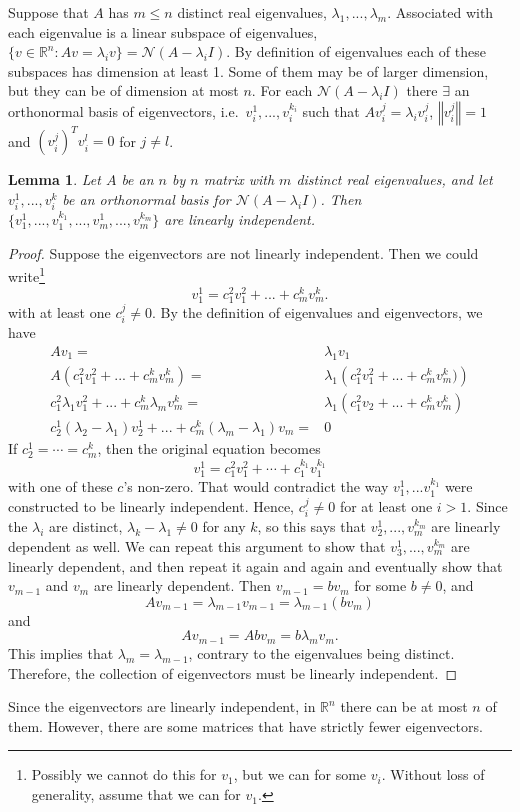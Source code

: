 \documentclass[12pt,reqno]{amsart}
\newtheorem{lemma}{Lemma}[section]
\theoremstyle{definition}
\def\R{\mathbb{R}}
\newcommand{\norm}[1]{\left\Vert {#1} \right\Vert}
\begin{document}
Suppose that $A$ has $m\leq n$ distinct real eigenvalues, $\lambda_1,
..., \lambda_m$.  Associated with each eigenvalue is a linear subspace
of eigenvalues, $\{v \in \R^n: Av = \lambda_i v\} = \mathcal{N}(A -
\lambda_i I)$. By definition of eigenvalues each of these subspaces has
dimension at least 1. Some of them may be of larger dimension, but
they can be of dimension at most $n$. For each $\mathcal{N}(A -
\lambda_i I)$ there $\exists$ an orthonormal basis of eigenvectors, i.e.\
$v_i^1, ... , v_i^{k_i}$ such that $A v_i^j = \lambda_i v_i^j$,
$\norm{v_i^j} = 1$ and $(v_i^j)^T v_i^l = 0$ for $j \neq l$. 
\begin{lemma}
  Let $A$ be an $n$ by $n$ matrix with $m$ distinct real eigenvalues,
  and let $v_i^1, ..., v_i^k$ be an orthonormal basis for $\mathcal{N}(A -
  \lambda_i I)$. Then $\{v_1^1, ..., v_1^{k_1}, ..., v_m^1, ...,
  v_m^{k_m}\}$ are linearly independent. 
\end{lemma}
\begin{proof}
  Suppose the eigenvectors are not linearly independent. Then we could
  write\footnote{Possibly we cannot do this for $v_1$, but we can for
    some $v_i$. Without loss of generality, assume that we can for
    $v_1$.}
  \[ v_1^1 = c_1^2 v_1^2 + ... + c^k_m v^k_m. \]
  with at least one $c_i^j \neq 0$.
  By the definition of eigenvalues and eigenvectors, we have
  \begin{align*} A v_1 = & \lambda_1 v_1 \\
    A (c_1^2 v_1^2 + ... + c^k_m v^k_m)= & \lambda_1 \left(c_1^2 v_1^2 + ... + c^k_m v^k_m)\right) \\
    c_1^2 \lambda_1 v^2_1 + ... + c^k_m \lambda_m v^k_m = & \lambda_1
    \left(c_1^2 v_2 + ... + c_m^k v_m^k\right) \\
    c_2^1 (\lambda_2 - \lambda_1) v_2^1 + ... + c_m^k (\lambda_m -
    \lambda_1) v_m = & 0
  \end{align*}
  If $c_2^1 = \cdots = c_m^k$, then the original equation becomes 
  \[ v_1^1 = c_1^2 v_1^2 + \cdots + c_1^{k_1}v_1^{k_1} \] with one of
  these $c$'s non-zero. That would contradict the way $v_1^1 ,
  ... v_1^{k_1}$ were constructed to be linearly independent. Hence,
  $c_i^j \neq 0$ for at least one $i > 1$.  Since the $\lambda_i$ are
  distinct, $\lambda_k - \lambda_1 \neq 0$ for any $k$, so this says
  that $v_2^1, ..., v_m^{k_m}$ are linearly dependent as well. We can
  repeat this argument to show that $v_3^1, ..., v_m^{k_m}$ are
  linearly dependent, and then repeat it again and again and
  eventually show that $v_{m-1}$ and $v_m$ are linearly
  dependent. Then $v_{m-1} = bv_m$ for some $b \neq 0$, and
  \[ A v_{m-1} = \lambda_{m-1} v_{m-1} = \lambda_{m-1} (b v_m) \]
  and 
  \[ A v_{m-1} = A b v_m = b \lambda_m v_m. \] This implies that
  $\lambda_m = \lambda_{m-1}$, contrary to the eigenvalues being
  distinct. Therefore, the collection of eigenvectors must be linearly
  independent.
\end{proof}
Since the eigenvectors are linearly independent, in $\R^n$ there
can be at most $n$ of them. However, there are some matrices that have
strictly fewer eigenvectors. 
\end{document}
